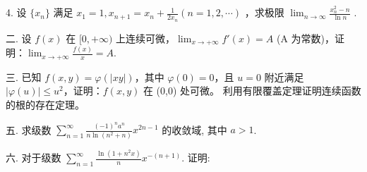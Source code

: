 \documentclass{examcollection}
\begin{document}
{\begin{minipage}{\textwidth}
4. 设  $\{x_{n}\}$  满足  $x_{1}=1, x_{n+1}=x_{n}+\frac{1}{2x_{n}}(n=1,2,\cdots)$ ，求极限  $\lim_{n\to\infty}\frac{x_{n}^{2}-n}{\ln n}$ .\par
二. 设 $f(x)$ 在 $[0, +\infty)$ 上连续可微，$\lim_{x \to +\infty} f'(x) = A$ (A 为常数)，证明：$\lim_{x \to +\infty} \frac{f(x)}{x} = A$.\par
三. 已知 $f(x, y) = \varphi(|xy|)$，其中 $\varphi(0) = 0$，且 $u = 0$ 附近满足 $|\varphi(u)| \leq u^2$，证明：$f(x, y)$ 在 (0,0) 处可微。
利用有限覆盖定理证明连续函数的根的存在定理。\par
五. 求级数 $\sum_{n=1}^{\infty} \frac{(-1)^n a^n}{n \ln(n^2 + n)} x^{2n-1}$ 的收敛域, 其中 $a > 1$.\par
六. 对于级数 $\sum_{n=1}^{\infty} \frac{\ln(1 + n^2 x)}{n} x^{-(n+1)}$. 证明:\par
\end{minipage}}
\ifdim\dimexpr\ht\proofbox+\dp\proofbox\relax>\textheight
\noindent\resizebox{!}{\textheight}{\usebox{\proofbox}}\else\noindent\usebox{\proofbox}\fi\clearpage
\end{document}
